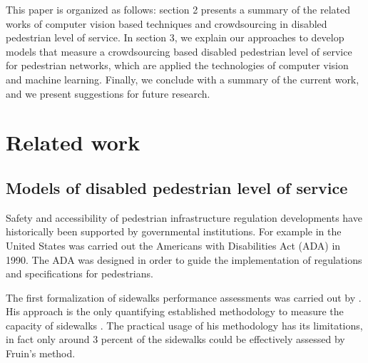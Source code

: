 \documentclass[10pt,conference,a4paper]{IEEEtran}
\begin{document}
This paper is organized as follows: section 2 presents a summary of the related works of computer vision based techniques and crowdsourcing in disabled pedestrian level of service. In section 3, we explain our approaches to develop models that measure a crowdsourcing based disabled pedestrian level of service for pedestrian networks, which are applied the technologies of computer vision and machine learning. Finally, we conclude with a summary of the current work, and we present suggestions for future research.



\section{Related work}

\subsection{Models of disabled pedestrian level of service}


Safety and accessibility of pedestrian infrastructure regulation developments have historically been supported by governmental institutions. For example in the United States was carried out the Americans with Disabilities Act (ADA) in 1990. The ADA was designed in order to guide the implementation of regulations and specifications for pedestrians.
 
The first formalization of sidewalks performance assessments was carried out by \cite{fruin1971pedestrian}. His approach is the only quantifying established methodology to measure the capacity of sidewalks \cite{landis_modeling_2001}. The practical usage of his methodology has its limitations, in fact only around 3 percent of the sidewalks could be effectively assessed by Fruin’s method. 
\end{document}
